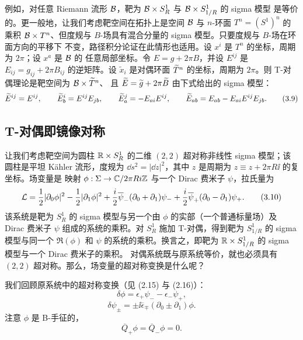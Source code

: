 例如，对任意 Riemann 流形 $\mathcal{B}$，靶为 $\mathcal{B}\times S^1_R$ 与 $\mathcal{B}\times S^1_{1/R}$ 的 sigma 模型
是等价的。更一般地，让我们考虑靶空间在拓扑上是空间 $\mathcal{B}$ 与 $n$-环面 $T^n=(S^1)^n$ 的乘积
$\mathcal{B}\times T^n$、但度规与 $B$-场具有混合分量的 sigma 模型。只要度规与 $B$-场在环面方向的平移下
不变，路径积分论证在此情形也适用。设 $x^i$ 是 $T^n$ 的坐标，周期为 $2\pi$；设 $x^a$ 是 $\mathcal{B}$ 的
任意局部坐标。令 $E=g+2\pi B$，并设 $E^{ij}$ 是 $E_{ij}=g_{ij}+2\pi B_{ij}$ 的逆矩阵。设
$\tilde x_i$ 是对偶环面 $\widetilde{T}^n$ 的坐标，周期为 $2\pi$。则 T-对偶理论是靶空间为 $\mathcal{B}\times\widetilde{T}^n$、
且 $\widetilde{E}=\widetilde{g}+2\pi\widetilde{B}$ 由下式给出的 sigma 模型：
\begin{equation}
  \widetilde{E}^{ij}=E^{ij},\qquad
  \widetilde{E}^{i}_{b}=E^{ij}E_{jb},\qquad
  \widetilde{E}_{a}^{j}=-E_{ai}E^{ij},\qquad
  \widetilde{E}_{ab}=E_{ab}-E_{ai}E^{ij}E_{jb}. \tag{3.9}
\end{equation}

\subsection{T-对偶即镜像对称}

让我们考虑靶空间为圆柱 $\mathbb{R}\times S^1_R$ 的二维 $(2,2)$ 超对称非线性 sigma 模型；该圆柱是平坦
Kähler 流形，度规为 $\dd s^2=|\dd z|^2$，其中 $z$ 是周期为 $z\equiv z+2\pi R\ii$ 的复坐标。场变量是
映射 $\phi:\Sigma\to\mathbb{C}/2\pi Ri\mathbb{Z}$ 与一个 Dirac 费米子 $\psi$，拉氏量为
\begin{equation}
  \mathcal{L}=\frac{1}{2}|\partial_0\phi|^2-\frac{1}{2}|\partial_1\phi|^2
  +\frac{i}{2}\overline{\psi}_-(\partial_0+\partial_1)\psi_-
  +\frac{i}{2}\overline{\psi}_+(\partial_0-\partial_1)\psi_+. \tag{3.10}
\end{equation}
该系统是靶为 $S^1_R$ 的 sigma 模型与另一个由 $\phi$ 的实部（一个普通标量场）及 Dirac 费米子 $\psi$
组成的系统的乘积。对 $S^1_R$ 施加 T-对偶，得到靶为 $S^1_{1/R}$ 的 sigma 模型与同一个 $\Re(\phi)$
和 $\psi$ 的系统的乘积。换言之，即靶为 $\mathbb{R}\times S^1_{1/R}$ 的 sigma 模型与一个 Dirac 费米子的乘积。
对偶系统既与原系统等价，就也必须具有 $(2,2)$ 超对称。那么，场变量的超对称变换是什么呢？

我们回顾原系统中的超对称变换（见 (2.15) 与 (2.16)）：
\begin{equation}
  \delta\phi=\epsilon_+\psi_--\epsilon_-\psi_+, \tag{3.11}
\end{equation}
\begin{equation}
  \delta\psi_\pm=\pm\ii\overline{\epsilon}_\mp(\partial_0\pm\partial_1)\phi. \tag{3.12}
\end{equation}
注意 $\phi$ 是 B-手征的，
\begin{equation}
  \overline{Q}_+\phi=\overline{Q}_-\phi=0. \tag{3.13}
\end{equation}

